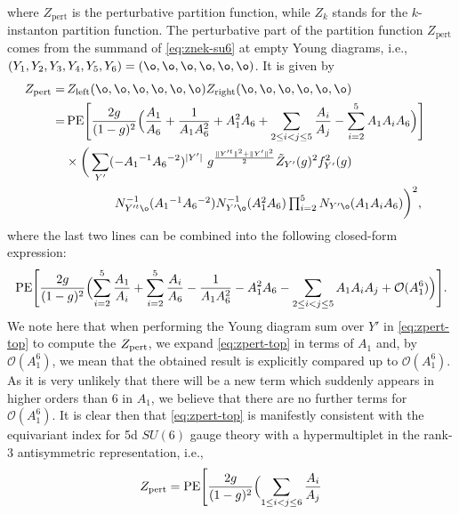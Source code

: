 \documentclass[letterpaper, 11pt]{article}
\begin{document}
{\begin{align}
\end{align}
where $Z_{\text{pert}}$ is the perturbative partition function, while $Z_k$ stands for the $k$-instanton partition function. 
The perturbative part of the partition function $Z_{\text{pert}}$ comes from the summand of \eqref{eq:znek-su6} at empty Young diagrams, i.e., %
$(Y_1, Y_2, Y_3, Y_4, Y_5, Y_6) = (\o,\o,\o,\o,\o,\o)$.
It is given by
\begin{align}
\begin{split}
Z_{\rm pert} 
=& \,
Z_{\text{left}}(\o,\o,\o,\o,\o,\o)
Z_{\text{right}}(\o,\o,\o,\o,\o,\o)
\cr
=&\, 
\text{PE} \Biggl[ 
\frac{2g}{(1-g)^2} 
\Bigl( \frac{A_1}{A_6} + \frac{1}{A_1A_6^2} + A_1^2  A_6 
+ \sum_{2 \le i <  j \le 5} \frac{A_i}{A_j}
- \sum_{i=2}^5 A_1 A_i  A_6
\Bigr)
\Biggr]
\cr 
& 
\times \bigg(\sum_{Y'} ( - A_1{}^{-1} A_6{}^{-2})^{|Y'|} \ 
g^{\frac{\Vert Y'^t \Vert ^2+\Vert Y'\Vert ^2}{2}} \tilde{Z}_{Y'}(g)^2 f_{Y'}^2(g)
\cr 
& \qquad \qquad
\textstyle N_{Y'^t \o }^{-1} (A_1{}^{-1} A_6{}^{-2})
 N^{-1}_{Y' \o } (A_1^2  A_6)\prod_{i=2}^5 N_{Y' \o } (A_1 A_i  A_6)\bigg)^2 ,\label{eq:zpert-top}
\end{split}
\end{align}
where the last two lines can be  combined into the following closed-form expression:
\begin{align}
  \text{PE} \Biggl[ 
    \frac{2g}{(1-g)^2} 
    \Bigl(\sum_{i=2}^5  \frac{A_1}{A_i} +\sum_{i=2}^5  \frac{A_i}{A_6} - \frac{1}{A_1A_6^2} - A_1^2  A_6 
    - \sum_{2\leq i<j \leq 5} A_1 A_i  A_j + \mathcal{O}(A_1^6)
    \Bigr)
    \Biggr].
\end{align}
We note here that when performing the Young diagram sum over $Y'$ in \eqref{eq:zpert-top} to compute the $Z_{\rm pert}$, we expand \eqref{eq:zpert-top} in terms of $A_1$ and, by $\mathcal{O}(A_1^6)$, we mean that the obtained result is explicitly compared up to $\mathcal{O}(A_1^6)$. As it is very unlikely that there will be a new term which suddenly appears  in higher orders than 6 in $A_1$, we believe that there are no further terms for $\mathcal{O}(A_1^6)$.  
It is clear then that \eqref{eq:zpert-top} is manifestly consistent with the equivariant index  \cite{Shadchin:2005mx} for 5d $SU(6)$ gauge theory with a hypermultiplet in the rank-3 antisymmetric representation, %
i.e., 
\begin{align}
  \label{eq:SU6pert}
  Z_{\rm pert}  = \text{PE} \Biggl[ 
    \frac{2g}{(1-g)^2} 
    \Bigl(\sum_{1\leq i<j \leq 6}  \frac{A_i}{A_j} 

\end{align}}
\end{document}
